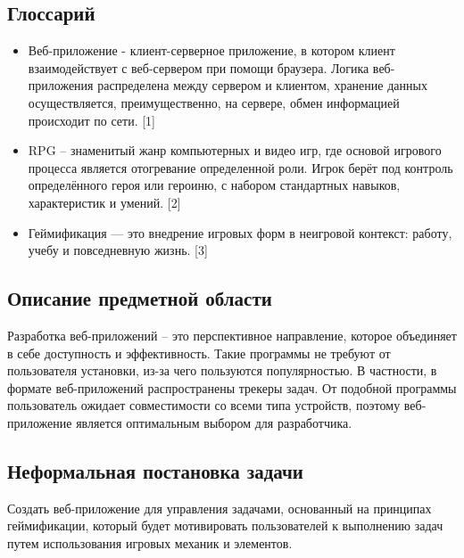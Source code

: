 \documentclass[../document.tex]{subfiles}
\begin{document}
\subsection{Глоссарий}
\begin{itemize}
    \item Веб-приложение - клиент-серверное приложение, в котором клиент взаимодействует с веб-сервером при помощи браузера. Логика веб-приложения распределена между сервером и клиентом, хранение данных осуществляется, преимущественно, на сервере, обмен информацией происходит по сети. [1]
    \item RPG – знаменитый жанр компьютерных и видео игр, где основой игрового процесса является отогревание определенной роли. Игрок берёт под контроль определённого героя или героиню, с набором стандартных навыков, характеристик и умений. [2]
    \item Геймификация — это внедрение игровых форм в неигровой контекст: работу, учебу и повседневную жизнь. [3]
\end{itemize}
\subsection{Описание предметной области}
\par Разработка веб-приложений – это перспективное направление, которое объединяет в себе доступность и эффективность. Такие программы не требуют от пользователя установки, из-за чего пользуются популярностью. В частности, в формате веб-приложений распространены трекеры задач. От подобной программы пользователь ожидает совместимости со всеми типа устройств, поэтому веб-приложение является оптимальным выбором для разработчика.
\subsection{Неформальная постановка задачи}
\par Создать веб-приложение для управления задачами, основанный на принципах геймификации, который будет мотивировать пользователей к выполнению задач путем использования игровых механик и элементов.
\pagebreak
\end{document}
